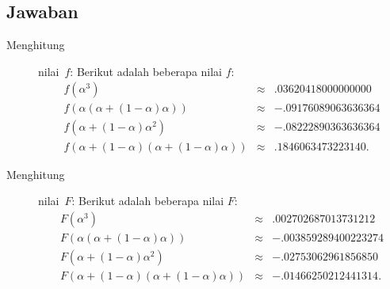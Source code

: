 \subsection*{Jawaban}
\begin{description}
\item [{Menghitung}] nilai~$f$: \label{ans:evaluatingf}Berikut adalah
beberapa nilai $f$:
\begin{eqnarray*}
f(\alpha^{3}) & \approx & .03620418000000000\\
f(\alpha(\alpha+(1-\alpha)\alpha)) & \approx & -.09176089063636364\\
f(\alpha+(1-\alpha)\alpha^{2}) & \approx & -.08222890363636364\\
f(\alpha+(1-\alpha)(\alpha+(1-\alpha)\alpha)) & \approx & .1846063473223140.
\end{eqnarray*}
\item [{Menghitung}] nilai~$F$: \label{ans:evaluatingF}Berikut adalah
beberapa nilai $F$:
\begin{eqnarray*}
F(\alpha^{3}) & \approx & .002702687013731212\\
F(\alpha(\alpha+(1-\alpha)\alpha)) & \approx & -.003859289400223274\\
F(\alpha+(1-\alpha)\alpha^{2}) & \approx & -.02753062961856850\\
F(\alpha+(1-\alpha)(\alpha+(1-\alpha)\alpha)) & \approx & -.01466250212441314.
\end{eqnarray*}
\end{description}

